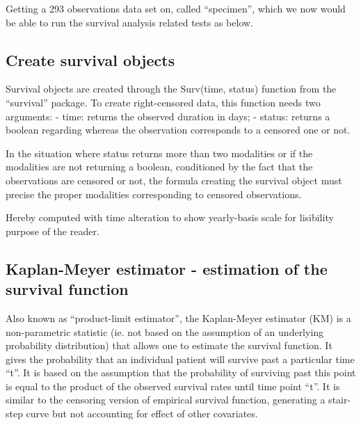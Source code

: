 \documentclass[]{article}
\newenvironment{Shaded}{\begin{snugshade}}{\end{snugshade}}
\newcommand{\KeywordTok}[1]{\textcolor[rgb]{0.13,0.29,0.53}{\textbf{#1}}}
\newcommand{\FloatTok}[1]{\textcolor[rgb]{0.00,0.00,0.81}{#1}}
\newcommand{\StringTok}[1]{\textcolor[rgb]{0.31,0.60,0.02}{#1}}
\newcommand{\OperatorTok}[1]{\textcolor[rgb]{0.81,0.36,0.00}{\textbf{#1}}}
\newcommand{\NormalTok}[1]{#1}
\begin{document}
Getting a 293 observations data set on, called ``specimen'', which we
now would be able to run the survival analysis related tests as below.

\subsection{Create survival objects}\label{create-survival-objects}

Survival objects are created through the Surv(time, status) function
from the ``survival'' package. To create right-censored data, this
function needs two arguments: - time: returns the observed duration in
days; - status: returns a boolean regarding whereas the observation
corresponds to a censored one or not.

In the situation where status returns more than two modalities or if the
modalities are not returning a boolean, conditioned by the fact that the
observations are censored or not, the formula creating the survival
object must precise the proper modalities corresponding to censored
observations.

\begin{Shaded}
\end{Shaded}

Hereby computed with time alteration to show yearly-basis scale for
lisibility purpose of the reader.

\subsection{Kaplan-Meyer estimator - estimation of the survival
function}\label{kaplan-meyer-estimator---estimation-of-the-survival-function}

Also known as ``product-limit estimator'', the Kaplan-Meyer estimator
(KM) is a non-parametric statistic (ie. not based on the assumption of
an underlying probability distribution) that allows one to estimate the
survival function. It gives the probability that an individual patient
will survive past a particular time ``t''. It is based on the assumption
that the probability of surviving past this point is equal to the
product of the observed survival rates until time point ``t''. It is
similar to the censoring version of empirical survival function,
generating a stair-step curve but not accounting for effect of other
covariates.
\end{document}
